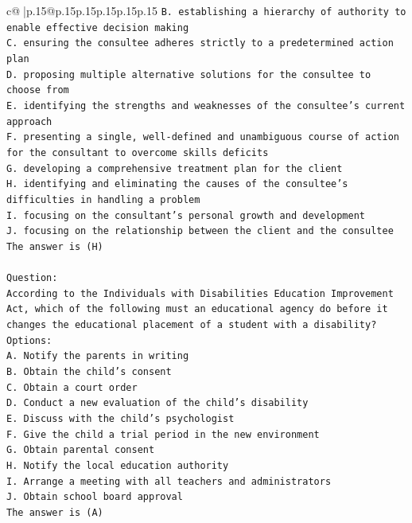 \documentclass{article}
\begin{document}
{\begin{supertabular}{c@{$\;$}|p{.15\linewidth}@{}p{.15\linewidth}p{.15\linewidth}p{.15\linewidth}p{.15\linewidth}p{.15\linewidth}}
{{{\texttt{B. establishing a hierarchy of authority to enable effective decision making} \\
\texttt{C. ensuring the consultee adheres strictly to a predetermined action plan} \\
\texttt{D. proposing multiple alternative solutions for the consultee to choose from} \\
\texttt{E. identifying the strengths and weaknesses of the consultee's current approach} \\
\texttt{F. presenting a single, well{-}defined and unambiguous course of action for the consultant to overcome skills deficits} \\
\texttt{G. developing a comprehensive treatment plan for the client} \\
\texttt{H. identifying and eliminating the causes of the consultee's difficulties in handling a problem} \\
\texttt{I. focusing on the consultant's personal growth and development} \\
\texttt{J. focusing on the relationship between the client and the consultee} \\
\texttt{The answer is (H)} \\
\\ 
\texttt{Question:} \\
\texttt{According to the Individuals with Disabilities Education Improvement Act, which of the following must an educational agency do before it changes the educational placement of a student with a disability?} \\
\texttt{Options:} \\
\texttt{A. Notify the parents in writing} \\
\texttt{B. Obtain the child's consent} \\
\texttt{C. Obtain a court order} \\
\texttt{D. Conduct a new evaluation of the child's disability} \\
\texttt{E. Discuss with the child's psychologist} \\
\texttt{F. Give the child a trial period in the new environment} \\
\texttt{G. Obtain parental consent} \\
\texttt{H. Notify the local education authority} \\
\texttt{I. Arrange a meeting with all teachers and administrators} \\
\texttt{J. Obtain school board approval} \\
\texttt{The answer is (A)} \\
}}}
\end{supertabular}}
\end{document}

